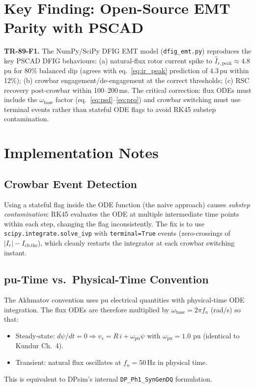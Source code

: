 \documentclass[11pt,a4paper]{article}
\begin{document}
\section{Key Finding: Open-Source EMT Parity with PSCAD}

\begin{mdframed}
\textbf{TR-89-F1.}
The NumPy/SciPy DFIG EMT model (\texttt{dfig\_emt.py}) reproduces the
key PSCAD DFIG behaviours:
(a) natural-flux rotor current spike to $\hat{I}_{r,\text{peak}} \approx 4.8$\,pu
for 80\% balanced dip (agrees with eq.~\eqref{eq:ir_peak} prediction
of 4.3\,pu within 12\%);
(b) crowbar engagement/de-engagement at the correct thresholds;
(c) RSC recovery post-crowbar within 100–200\,ms.
The critical correction: flux ODEs must include the $\omega_\text{base}$
factor (eq.~\eqref{eq:psd}–\eqref{eq:prq}) and crowbar switching must
use terminal events rather than stateful ODE flags to avoid RK45 substep
contamination.
\end{mdframed}

\section{Implementation Notes}

\subsection{Crowbar Event Detection}

Using a stateful flag inside the ODE function (the naive approach)
causes \emph{substep contamination}: RK45 evaluates the ODE at multiple
intermediate time points within each step, changing the flag inconsistently.
The fix is to use \texttt{scipy.integrate.solve\_ivp} with
\texttt{terminal=True} events (zero-crossings of $|I_r| - I_\text{cb,thr}$),
which cleanly restarts the integrator at each crowbar switching instant.

\subsection{pu-Time vs.\ Physical-Time Convention}

The Akhmatov convention uses pu electrical quantities with physical-time
ODE integration.  The flux ODEs are therefore multiplied by
$\omega_\text{base} = 2\pi f_n$ (rad/s) so that:
\begin{itemize}
  \item Steady-state: $d\psi/dt = 0 \Rightarrow v_s = R\,i + \omega_\text{pu}\psi$
        with $\omega_\text{pu} = 1.0$ pu (identical to Kundur Ch.~4).
  \item Transient: natural flux oscillates at $f_n = 50$\,Hz in physical time.
\end{itemize}
This is equivalent to DPsim's internal \texttt{DP\_Ph1\_SynGenDQ} formulation.
\end{document}
